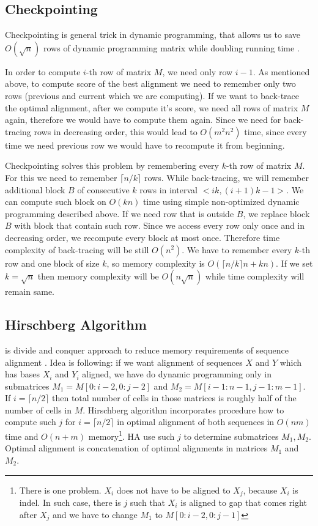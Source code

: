 \subsection{Checkpointing}

Checkpointing is general trick in dynamic programming, that allows us to save
$O(\sqrt n)$ rows of dynamic programming matrix while doubling running time
\cite{Grice1997}. 

In order to compute $i$-th row of matrix $M$, we need only row $i-1$. As
mentioned above, to compute score of the best alignment we need to remember only
two rows (previous and current which we are computing).  If we want to
back-trace the optimal alignment, after we compute it's score, we need all
rows of matrix $M$ again, therefore we would have to compute them again.
Since we need for back-tracing rows in decreasing order, this would lead to
$O(m^2n^2)$ time, since every time we need previous row we would have to recompute
it from beginning.

Checkpointing solves this problem by remembering every $k$-th row of matrix $M$.
For this we need to remember $\lceil n/k\rceil$ rows.  While back-tracing, we
will remember additional block $B$ of consecutive $k$ rows in interval
$<ik,(i+1)k-1>$. We can compute such block on $O(kn)$ time using simple
non-optimized dynamic programming described above.  If we need row that
is outside $B$, we replace block $B$ with block that contain such row. Since we
access every row only once and in decreasing order, we recompute every block at
most once. Therefore time complexity of back-tracing will be still $O(n^2)$. We
have to remember every $k$-th row and one block of size $k$, so memory
complexity is $O(\lceil n/k\rceil n+ kn)$. If we set $k=\sqrt n$ then memory
complexity will be $O(n\sqrt n)$ while time complexity will remain same.


 
\subsection{Hirschberg Algorithm}

 is divide and conquer approach to reduce
memory requirements of sequence alignment \cite{Hirschberg1975}. Idea is
following: if we want alignment of sequences $X$ and $Y$ which has bases $X_i$
and $Y_i$ aligned, we have do dynamic programming only in submatrices
$M_1=M[0:i-2,0:j-2]$ and $M_2=M[i-1:n-1,j-1:m-1]$. If $i=\lceil n/2\rceil$ then
total number of cells in those matrices is roughly half of the number of cells
in $M$. Hirschberg algorithm incorporates procedure how to compute such $j$ for
$i=\lceil n/2\rceil$ in optimal alignment of both sequences in $O(nm)$ time and
$O(n+m)$ memory\footnote{There is one problem. $X_i$ does not have to be aligned
to $X_j$, because $X_i$ is indel. In such case, there is $j$ such that $X_i$ is
aligned to gap that comes right after $X_j$ and we have to change $M_1$ to
$M[0:i-2,0:j-1]$}. HA use such $j$ to determine submatrices $M_1,M_2$. Optimal
alignment is concatenation of optimal alignments in matrices $M_1$ and $M_2$.

